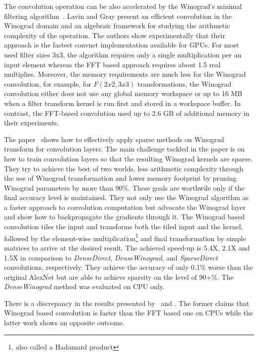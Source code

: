 The convolution operation can be also accelerated by the Winograd's minimal filtering algorithm~\cite{Lavin2016FastConvolution}. Lavin and Gray present an efficient convolution in the Winograd domain and an algebraic framework for studying the arithmetic complexity of the operation. The authors show experimentally that their approach is the fastest convnet implementation available for GPUs. For most used filter sizes 3x3, the algorithm requires only a single multiplication per an input element whereas the FFT based approach requires about 1.5 real multiplies. Moreover, the memory requirements are much less for the Winograd convolution, for example, for $F(2x2,3x3)$ transformations, the Winograd convolution either does not use any global memory workspace or up to 16 MB when a filter transform kernel is run first and stored in a workspace
buffer. In contrast, the FFT-based convolution used up to 2.6 GB of additional memory in their experiments.

The paper~\cite{sparseWinograd} shows how to effectively apply sparse methods on Winograd transform for convolution layers. The main challenge tackled in the paper is on how to train convolution layers so that the resulting Winograd kernels are sparse. They try to achieve the best of two worlds, less arithmetic complexity through the use of Winograd transformation and lower memory footprint by pruning Winograd parameters by more than 90\%. These goals are worthwile only if the final accuracy level is maintained. They not only use the Winograd algorithm as a faster approach to convolution computation but advocate the Winograd layer and show how to backpropagate the gradients through it. The Winograd based convolution tiles the input and transforms both the tiled input and the kernel, followed by the element-wise multiplication\footnote{also called a Hadamard product} and final transformation by simple matrices to arrive at the desired result. The achieved speed-up is 5.4X, 2.1X and 1.5X in comparison to \textit{DenseDirect}, \textit{DenseWinograd}, and \textit{SparseDirect} convolutions, respectively. They achieve the accuracy of only 0.1\% worse than the original AlexNet but are able to achieve sparsity on the level of 90+\%. The \textit{DenseWinograd} method was evaluated on CPU only. 

There is a discrepancy in the results presented by~\cite{intel-gray} and \cite{aleks2018fft}. The former claims that Winograd based convolution is faster than the FFT based one on CPUs while the latter work shows an opposite outcome.
\fi